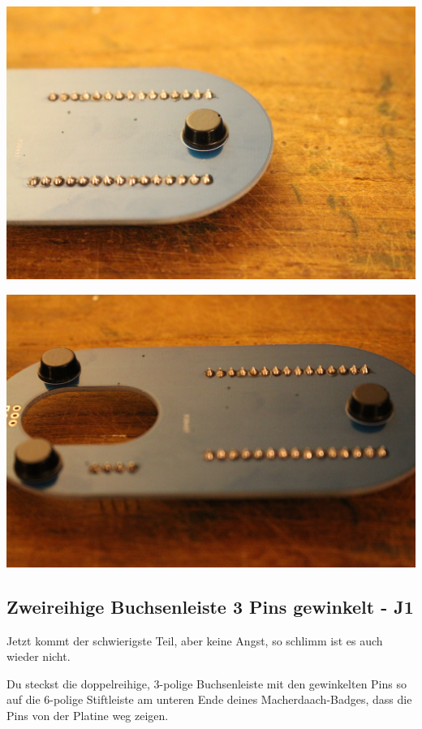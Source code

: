 \documentclass{article}
\begin{document}
\begin{minipage}[b]{0.5\textwidth}
	\includegraphics[width=\textwidth]{Bilder2019/IMG_6480.JPG}
\end{minipage}
\begin{minipage}[b]{0.5\textwidth}
	\includegraphics[width=\textwidth]{Bilder2019/IMG_6481.JPG}
\end{minipage}

\subsection{Zweireihige Buchsenleiste 3 Pins gewinkelt - J1}

Jetzt kommt der schwierigste Teil, aber keine Angst, so schlimm ist es auch wieder nicht.

Du steckst die doppelreihige, 3-polige Buchsenleiste mit den gewinkelten Pins so auf die 6-polige Stiftleiste am unteren Ende deines Macherdaach-Badges, dass die Pins von der Platine weg zeigen.
\end{document}
